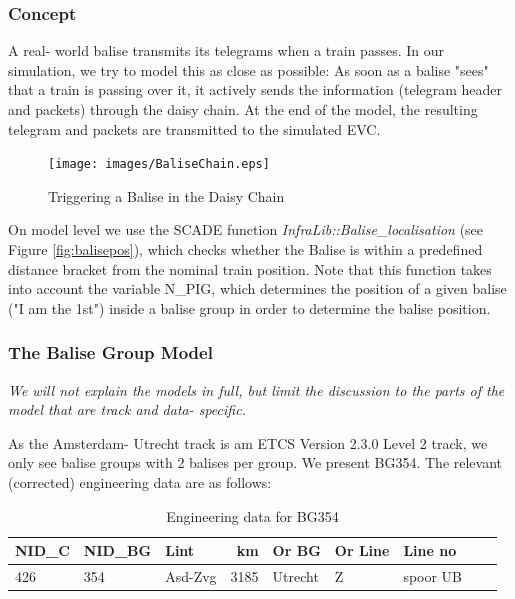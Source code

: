 \documentclass{template/openetcs_article}
\begin{document}
\subsubsection{Concept}

A real- world balise transmits its telegrams when a train passes. In our simulation, we try to model this as close as possible: As soon as a balise "sees" that a train is passing over it, it actively sends the information (telegram header and packets) through the daisy chain. At the end of the model, the resulting telegram and packets are transmitted to the simulated EVC. 
\begin{figure}[H]
  \centering
  \texttt{[image: images/BaliseChain.eps]}
  \caption{Triggering a Balise in the Daisy Chain}
  \label{fig:balisechain}
\end{figure}



On model level we use the SCADE function \emph{InfraLib::Balise\_localisation} (see Figure \ref{fig:balisepos}), which checks whether the Balise is within a predefined distance bracket from the nominal train position.\newline\newline 
Note that this function takes into account the variable N\_PIG, which determines the position of a given balise ("I am the 1st") inside a balise group in order to determine the balise position. 




\subsubsection{The Balise Group Model}

\emph{We will not explain the models in full, but limit the discussion to the parts of the model that are track and data- specific. }

As the Amsterdam- Utrecht track is am ETCS Version 2.3.0 Level 2 track, we only see balise groups with 2 balises per group.
We present BG354. The relevant (corrected) engineering data are as follows:

\begin{table}[H]
  \centering
    \footnotesize\sffamily
\begin{tabular}{| l| l| l| r| l| l| l| l l}
\hline
\bf{NID\_C} & \bf{NID\_BG} & \bf{Lint} & \bf{km} & \bf{Or BG} & \bf{Or Line} & \bf{Line no} \\ 
\hline

426 & 354 & Asd-Zvg & 3185 & Utrecht & Z & spoor UB \\

\hline
\end{tabular}
\caption{Engineering data for BG354}
  \label{tab:bg354}
\end{table}
\end{document}
